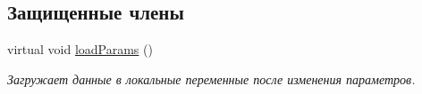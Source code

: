 \subsection*{Защищенные члены}
\begin{DoxyCompactItemize}
\item 
virtual void \hyperlink{class_core_1_1_task_a36027d8797e1bbaac2db06d0dd72aec9}{load\+Params} ()\hypertarget{class_core_1_1_task_a36027d8797e1bbaac2db06d0dd72aec9}{}\label{class_core_1_1_task_a36027d8797e1bbaac2db06d0dd72aec9}

\begin{DoxyCompactList}\small\item\em Загружает данные в локальные переменные после изменения параметров. \end{DoxyCompactList}\end{DoxyCompactItemize}
